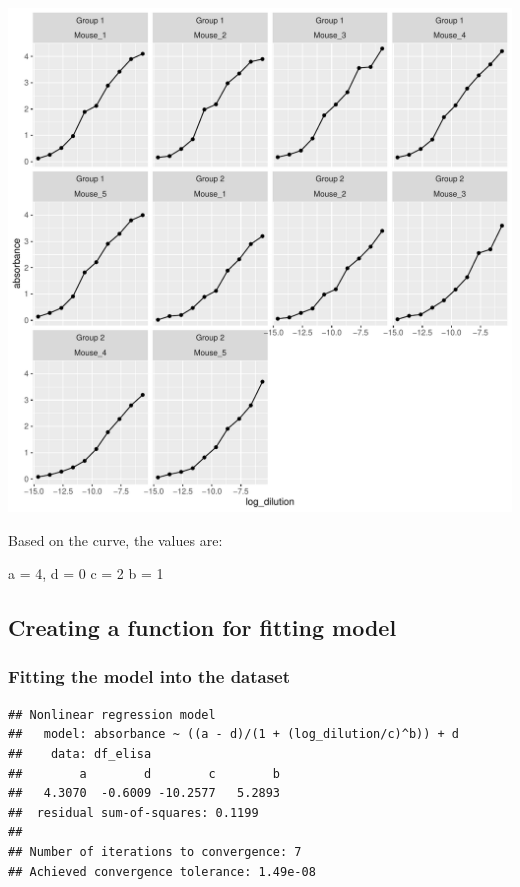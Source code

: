 \documentclass[
]{book}
\begin{document}
\begin{center}\includegraphics{csu-impactb_files/figure-latex/unnamed-chunk-50-1} \end{center}

Based on the curve, the values are:

a = 4,
d = 0
c = 2
b = 1

\hypertarget{creating-a-function-for-fitting-model}{%
\subsection{Creating a function for fitting model}\label{creating-a-function-for-fitting-model}}

\hypertarget{fitting-the-model-into-the-dataset}{%
\subsubsection{Fitting the model into the dataset}\label{fitting-the-model-into-the-dataset}}

\begin{verbatim}
## Nonlinear regression model
##   model: absorbance ~ ((a - d)/(1 + (log_dilution/c)^b)) + d
##    data: df_elisa
##        a        d        c        b 
##   4.3070  -0.6009 -10.2577   5.2893 
##  residual sum-of-squares: 0.1199
## 
## Number of iterations to convergence: 7 
## Achieved convergence tolerance: 1.49e-08
\end{verbatim}
\end{document}
